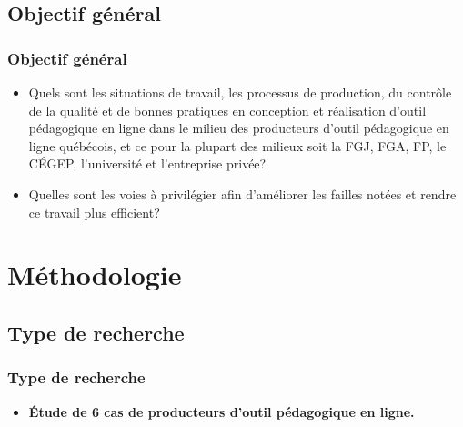                 \subsection{Objectif général} 
		\begin{frame}
			\frametitle{Objectif général}
                        
                        \begin{itemize} 
                        \item  Quels sont les situations de travail, les processus de production, du contrôle de la qualité et de bonnes pratiques en conception et réalisation d’outil pédagogique en ligne dans le milieu des producteurs d’outil pédagogique en ligne québécois, et ce pour la plupart des milieux soit la FGJ, FGA, FP, le CÉGEP, l’université et l’entreprise privée? 
                         \item Quelles sont les voies à privilégier afin d’améliorer les failles notées et rendre ce travail plus efficient?

                        \end{itemize}

             
                \end{frame}
                
	\section{Méthodologie} 
		
                        
				\subsection{Type de recherche} 
					\begin{frame}
						\frametitle{Type de recherche}
                        
                        			\begin{itemize} 
                       				 \item \textbf{Étude de 6 cas de producteurs d’outil pédagogique en ligne.} 

                       		 \end{itemize}
				\end{frame}
